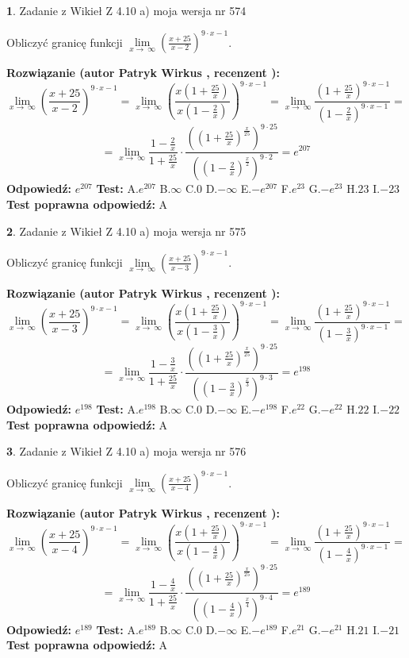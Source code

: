 \documentclass[12pt, a4paper]{article}
\theoremstyle{definition} %
\newtheorem{zad}{}
\newcommand{\zadStart}[1]{\begin{zad}#1\newline}
\newcommand{\zadStop}{\end{zad}}
\newcommand{\rozwStart}[2]{\noindent \textbf{Rozwiązanie (autor #1 , recenzent #2): }\newline}
\newcommand{\rozwStop}{\newline}
\newcommand{\odpStart}{\noindent \textbf{Odpowiedź:}\newline}
\newcommand{\odpStop}{\newline}
\newcommand{\testStart}{\noindent \textbf{Test:}\newline}
\newcommand{\testStop}{\newline}
\newcommand{\kluczStart}{\noindent \textbf{Test poprawna odpowiedź:}\newline}
\newcommand{\kluczStop}{\newline}
\begin{document}
\zadStart{Zadanie z Wikieł Z 4.10 a) moja wersja nr 574}

Obliczyć granicę funkcji  $\lim\limits_{x\to\ \infty}(\frac{x+25}{x-2})^{9\cdot x-1}$.
\zadStop
\rozwStart{Patryk Wirkus}{}
$$\lim\limits_{x\to\ \infty}(\frac{x+25}{x-2})^{9\cdot x-1} = \lim\limits_{x\to\ \infty}(\frac{x(1+\frac{25}{x})}{x(1-\frac{2}{x})})^{9\cdot x-1}=\lim\limits_{x\to\ \infty}\frac{(1+\frac{25}{x})^{9\cdot x-1}}{(1-\frac{2}{x})^{9\cdot x-1}}=$$
$$=\lim\limits_{x\to\ \infty}\frac{1-\frac{2}{x}}{1+\frac{25}{x}}\cdot\frac{((1+\frac{25}{x})^{\frac{x}{25}})^{9\cdot25}}{((1-\frac{2}{x})^{\frac{x}{2}})^{9\cdot2}}=e^{207}$$
\rozwStop
\odpStart
$e^{207}$
\odpStop
\testStart
A.$e^{207}$ B.$\infty$ C.$0$ D.$-\infty$ E.$-e^{207}$
F.$e^{23}$ G.$-e^{23}$
H.$23$
I.$-23$
\testStop
\kluczStart
A
\kluczStop



\zadStart{Zadanie z Wikieł Z 4.10 a) moja wersja nr 575}

Obliczyć granicę funkcji  $\lim\limits_{x\to\ \infty}(\frac{x+25}{x-3})^{9\cdot x-1}$.
\zadStop
\rozwStart{Patryk Wirkus}{}
$$\lim\limits_{x\to\ \infty}(\frac{x+25}{x-3})^{9\cdot x-1} = \lim\limits_{x\to\ \infty}(\frac{x(1+\frac{25}{x})}{x(1-\frac{3}{x})})^{9\cdot x-1}=\lim\limits_{x\to\ \infty}\frac{(1+\frac{25}{x})^{9\cdot x-1}}{(1-\frac{3}{x})^{9\cdot x-1}}=$$
$$=\lim\limits_{x\to\ \infty}\frac{1-\frac{3}{x}}{1+\frac{25}{x}}\cdot\frac{((1+\frac{25}{x})^{\frac{x}{25}})^{9\cdot25}}{((1-\frac{3}{x})^{\frac{x}{3}})^{9\cdot3}}=e^{198}$$
\rozwStop
\odpStart
$e^{198}$
\odpStop
\testStart
A.$e^{198}$ B.$\infty$ C.$0$ D.$-\infty$ E.$-e^{198}$
F.$e^{22}$ G.$-e^{22}$
H.$22$
I.$-22$
\testStop
\kluczStart
A
\kluczStop



\zadStart{Zadanie z Wikieł Z 4.10 a) moja wersja nr 576}

Obliczyć granicę funkcji  $\lim\limits_{x\to\ \infty}(\frac{x+25}{x-4})^{9\cdot x-1}$.
\zadStop
\rozwStart{Patryk Wirkus}{}
$$\lim\limits_{x\to\ \infty}(\frac{x+25}{x-4})^{9\cdot x-1} = \lim\limits_{x\to\ \infty}(\frac{x(1+\frac{25}{x})}{x(1-\frac{4}{x})})^{9\cdot x-1}=\lim\limits_{x\to\ \infty}\frac{(1+\frac{25}{x})^{9\cdot x-1}}{(1-\frac{4}{x})^{9\cdot x-1}}=$$
$$=\lim\limits_{x\to\ \infty}\frac{1-\frac{4}{x}}{1+\frac{25}{x}}\cdot\frac{((1+\frac{25}{x})^{\frac{x}{25}})^{9\cdot25}}{((1-\frac{4}{x})^{\frac{x}{4}})^{9\cdot4}}=e^{189}$$
\rozwStop
\odpStart
$e^{189}$
\odpStop
\testStart
A.$e^{189}$ B.$\infty$ C.$0$ D.$-\infty$ E.$-e^{189}$
F.$e^{21}$ G.$-e^{21}$
H.$21$
I.$-21$
\testStop
\kluczStart
A
\kluczStop
\end{document}
